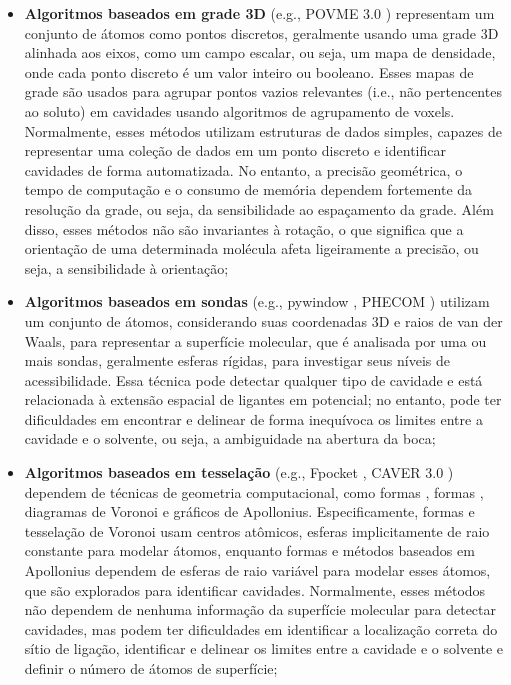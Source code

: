 \documentclass[Portugues]{phdquali}
\def\ie{i.e.\onedot}
\def\eg{e.g.\onedot}
\begin{document}
\begin{itemize}
  \item \textbf{Algoritmos baseados em grade 3D} (\eg, POVME 3.0 \cite{povme}) representam um conjunto de átomos como pontos discretos, geralmente usando uma grade 3D alinhada aos eixos, como um campo escalar, ou seja, um mapa de densidade, onde cada ponto discreto é um valor inteiro ou booleano. Esses mapas de grade são usados para agrupar pontos vazios relevantes (\ie, não pertencentes ao soluto) em cavidades usando algoritmos de agrupamento de voxels. Normalmente, esses métodos utilizam estruturas de dados simples, capazes de representar uma coleção de dados em um ponto discreto e identificar cavidades de forma automatizada. No entanto, a precisão geométrica, o tempo de computação e o consumo de memória dependem fortemente da resolução da grade, ou seja, da sensibilidade ao espaçamento da grade. Além disso, esses métodos não são invariantes à rotação, o que significa que a orientação de uma determinada molécula afeta ligeiramente a precisão, ou seja, a sensibilidade à orientação;

  \item \textbf{Algoritmos baseados em sondas} (\eg, pywindow \cite{pywindow}, PHECOM \cite{phecom}) utilizam um conjunto de átomos, considerando suas coordenadas 3D e raios de van der Waals, para representar a superfície molecular, que é analisada por uma ou mais sondas, geralmente esferas rígidas, para investigar seus níveis de acessibilidade. Essa técnica pode detectar qualquer tipo de cavidade e está relacionada à extensão espacial de ligantes em potencial; no entanto, pode ter dificuldades em encontrar e delinear de forma inequívoca os limites entre a cavidade e o solvente, ou seja, a ambiguidade na abertura da boca;
  
  \item \textbf{Algoritmos baseados em tesselação} (\eg, Fpocket \cite{fpocket}, CAVER 3.0 \cite{caver3}) dependem de técnicas de geometria computacional, como formas \textalpha, formas \textbeta, diagramas de Voronoi e gráficos de Apollonius. Especificamente, formas \textalpha\space e tesselação de Voronoi usam centros atômicos, esferas implicitamente de raio constante para modelar átomos, enquanto formas \textbeta\space e métodos baseados em Apollonius dependem de esferas de raio variável para modelar esses átomos, que são explorados para identificar cavidades. Normalmente, esses métodos não dependem de nenhuma informação da superfície molecular para detectar cavidades, mas podem ter dificuldades em identificar a localização correta do sítio de ligação, identificar e delinear os limites entre a cavidade e o solvente e definir o número de átomos de superfície;


\end{itemize}
\end{document}

